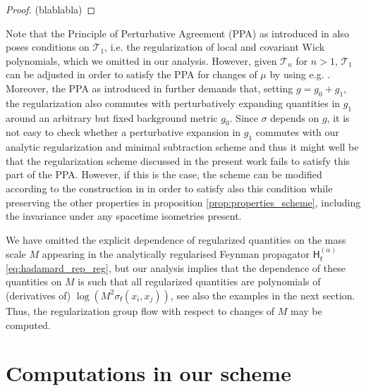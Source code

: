 \documentclass[12pt]{book}
\newcommand{\Tcal}{\mathcal{T}}
\newcommand{\Hsf}{\mathsf{H}}
\newcommand{\fsf}{\mathsf{f}}
\theoremstyle{break}
\begin{document}
\begin{proof}
(blablabla)
\end{proof}


\bigskip


Note that the Principle of Perturbative Agreement (PPA) as introduced in \cite{hollands_conservation_2005} also poses conditions on $\Tcal_1$, i.e. the regularization of local and covariant Wick polynomials, which we omitted in our analysis. However, given $\Tcal_n$ for $n>1$, $\Tcal_1$ can be adjusted in order to satisfy the PPA for changes of $\mu$ by using e.g. \cite[Theorem 3.3]{drago_generalised_2015}. Moreover, the PPA as introduced in \cite{hollands_conservation_2005} further demands that, setting $g = g_0 + g_1$, the regularization also commutes with perturbatively expanding quantities in $g_1$ around an arbitrary but fixed background metric $g_0$. Since $\sigma$ depends on $g$, it is not easy to check whether a perturbative expansion in $g_1$ commutes with our analytic regularization and minimal subtraction scheme and thus it might well be that the regularization scheme discussed in the present work fails to satisfy this part of the PPA. However, if this is the case, 
the scheme can be modified according to the construction in \cite{hollands_conservation_2005}
in order to satisfy also this condition while preserving the other properties in proposition \ref{prop:properties_scheme}, including the invariance under any spacetime isometries present.


\bigskip


We have omitted the explicit dependence of regularized quantities on the mass scale $M$ appearing in the analytically regularised Feynman propagator $\Hsf^{(\alpha)}_\fsf$ \eqref{eq:hadamard_rep_reg}, but our analysis implies that the dependence of these quantities on $M$ is such that all regularized quantities are polynomials of (derivatives of) $\log\left( M^2 \sigma_\fsf(x_i,x_j)\right)$, see also the examples in the next section. Thus, the regularization group flow with respect to changes of $M$ may be computed.


\chapter{Computations in our scheme}


\end{document}
